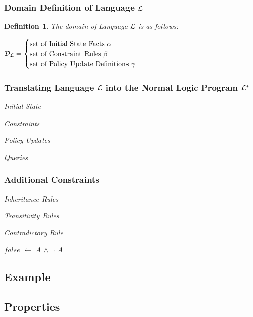 \documentclass[10pt, twocolumn]{article}
\newtheorem{definition}{Definition}
\begin{document}
      \subsubsection{Domain Definition of Language ${\cal L}$}

        \begin{definition}
          The domain of Language ${\cal L}$ is as follows:

          \begin{math}
            {\cal D}_{\cal L} = 
            \begin{cases}
              \mbox{set of Initial State Facts $\alpha$} \\
              \mbox{set of Constraint Rules $\beta$} \\
              \mbox{set of Policy Update Definitions $\gamma$}
            \end{cases}
          \end{math}
        \end{definition}

      \subsubsection{Translating Language ${\cal L}$ into the Normal Logic Program ${\cal L^{*}}$}

        \noindent \emph{Initial State}

        \noindent \emph{Constraints}

        \noindent \emph{Policy Updates}

        \noindent \emph{Queries}

      \subsubsection{Additional Constraints}

        \noindent \emph{Inheritance Rules}

        \noindent \emph{Transitivity Rules}

        \noindent \emph{Contradictory Rule}

          $false$ $\leftarrow$ $A$ $\land$ $\lnot$ $A$

    \subsection{Example}

    \subsection{Properties}
\end{document}
